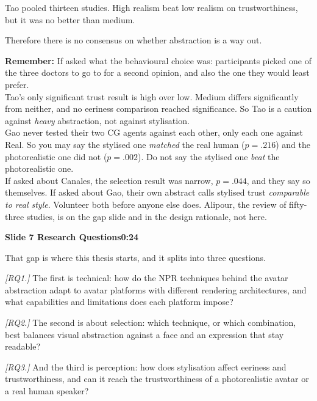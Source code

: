 \documentclass[11pt,a4paper]{article}
\newcommand{\slidehead}[3]{%
  \needspace{5\baselineskip}
  \vspace{0.9em}
  \noindent\colorbox{knblue}{\parbox{0.978\textwidth}{\vspace{1pt}\color{white}\textbf{Slide #1 \quad #2}\hfill\textbf{#3}\vspace{1pt}}}
  \vspace{0.35em}\par}
\newcommand{\remind}[1]{%
  \vspace{0.15em}
  \noindent\colorbox{knlight}{\parbox{0.972\textwidth}{\small\color{knblue}\textbf{Remember:} #1}}
  \vspace{0.2em}\par}
\newcommand{\pointto}[1]{{\color{knaccent}\textit{[#1]}}}
\begin{document}
Tao pooled thirteen studies. High realism beat low realism on trustworthiness, but it was no better than medium.

Therefore there is no consensus on whether abstraction is a way out.

\remind{If asked what the behavioural choice was: participants picked one of the three doctors to go to for a second opinion, and also the one they would least prefer.\\[0.4em] Tao's only significant trust result is high over low. Medium differs significantly from neither, and no eeriness comparison reached significance. So Tao is a caution against \emph{heavy} abstraction, not against stylisation.\\[0.4em] Gao never tested their two CG agents against each other, only each one against Real. So you may say the stylised one \emph{matched} the real human ($p=.216$) and the photorealistic one did not ($p=.002$). Do not say the stylised one \emph{beat} the photorealistic one.\\[0.4em] If asked about Canales, the selection result was narrow, $p = .044$, and they say so themselves. If asked about Gao, their own abstract calls stylised trust \emph{comparable to real style}. Volunteer both before anyone else does. Alipour, the review of fifty-three studies, is on the gap slide and in the design rationale, not here.}

\slidehead{7}{Research Questions}{0:24}

That gap is where this thesis starts, and it splits into three questions.

\pointto{RQ1.} The first is technical: how do the NPR techniques behind the avatar abstraction adapt to avatar platforms with different rendering architectures, and what capabilities and limitations does each platform impose?

\pointto{RQ2.} The second is about selection: which technique, or which combination, best balances visual abstraction against a face and an expression that stay readable?

\pointto{RQ3.} And the third is perception: how does stylisation affect eeriness and trustworthiness, and can it reach the trustworthiness of a photorealistic avatar or a real human speaker?
\end{document}
